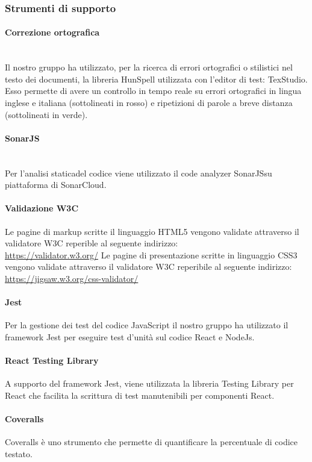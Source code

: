 \subsubsection{Strumenti di supporto}
	\paragraph{Correzione ortografica}\mbox{}\\ [1mm]
	Il nostro gruppo ha utilizzato, per la ricerca di errori ortografici o stilistici nel testo dei documenti, la libreria HunSpell utilizzata con l'editor di test: TexStudio. Esso permette di avere un controllo in tempo reale su errori ortografici in lingua inglese e italiana (sottolineati in rosso) e ripetizioni di parole a breve distanza (sottolineati in verde).
	\paragraph{SonarJS}\mbox{}\\ [1mm]
	Per l'analisi statica\glosp del codice viene utilizzato il code analyzer SonarJS\glosp su piattaforma di SonarCloud.
	\paragraph{Validazione W3C}
	Le pagine di markup scritte il linguaggio HTML5 vengono validate attraverso il validatore W3C reperible al seguente indirizzo:\\ \url{https://validator.w3.org/}
	Le pagine di presentazione scritte in linguaggio CSS3 vengono validate attraverso il validatore W3C reperibile al seguente indirizzo:\\ \url{https://jigsaw.w3.org/css-validator/}
	\paragraph{Jest}
	Per la gestione dei test del codice JavaScript il nostro gruppo ha utilizzato il framework Jest per eseguire test d'unità sul codice React e NodeJs.
	\paragraph{React Testing Library}
	A supporto del framework Jest, viene utilizzata la libreria Testing Library per React che facilita la scrittura di test manutenibili per componenti React.
	\paragraph{Coveralls}
	Coveralls è uno strumento che permette di quantificare la percentuale di codice testato.
	
